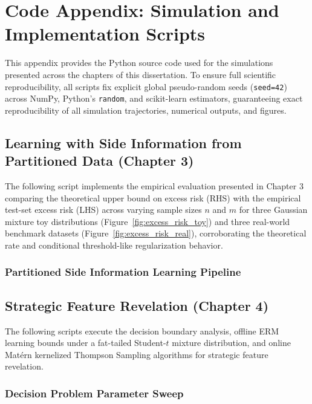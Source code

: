 \chapter{Code Appendix: Simulation and Implementation Scripts}
\label{ch:code_appendix}

This appendix provides the Python source code used for the simulations presented across the chapters of this dissertation. To ensure full scientific reproducibility, all scripts fix explicit global pseudo-random seeds (\texttt{seed=42}) across NumPy, Python's \texttt{random}, and scikit-learn estimators, guaranteeing exact reproducibility of all simulation trajectories, numerical outputs, and figures.

\section{Learning with Side Information from Partitioned Data (Chapter 3)}
\label{sec:code_side_info}

The following script implements the empirical evaluation presented in Chapter 3 comparing the theoretical upper bound on excess risk (RHS) with the empirical test-set excess risk (LHS) across varying sample sizes $n$ and $m$ for three Gaussian mixture toy distributions (Figure~\ref{fig:excess_risk_toy}) and three real-world benchmark datasets (Figure~\ref{fig:excess_risk_real}), corroborating the theoretical rate and conditional threshold-like regularization behavior.

\subsection{Partitioned Side Information Learning Pipeline}
\label{subsec:code_side_exp}


\section{Strategic Feature Revelation (Chapter 4)}
\label{sec:code_strat_rev}

The following scripts execute the decision boundary analysis, offline ERM learning bounds under a fat-tailed Student-$t$ mixture distribution, and online Mat\'ern kernelized Thompson Sampling algorithms for strategic feature revelation.

\subsection{Decision Problem Parameter Sweep}
\label{subsec:code_reg_decision}


